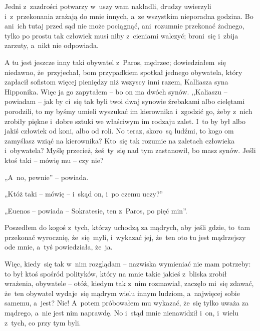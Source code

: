 \documentclass[a4paper,11pt]{article}
\begin{document}

Jedni z~zazdrości potwarzy w~uszy wam nakładli, drudzy uwierzyli
i~z~przekonania zrażają do mnie innych, a~ze wszystkim nieporadna
godzina. Bo ani~ich tutaj przed sąd nie może pociągnąć, ani~rozumnie
przekonać żadnego, tylko po prostu tak człowiek musi niby z~cieniami
walczyć; broni~się i~zbija zarzuty, a~nikt nie odpowiada.


\vspace{\spaceThree}



A tu jest jeszcze inny taki obywatel z~Paros, mędrzec;
dowiedziałem~się niedawno, że~przyjechał, bom przypadkiem spotkał
jednego obywatela, który zapłacił sofistom więcej pieniędzy niż
wszyscy inni razem, Kalliasza syna Hipponika. Więc ja go zapytałem --
bo on ma dwóch synów. ,,Kaliaszu -- powiadam -- jak by ci~się tak byli
twoi dwaj synowie źrebakami albo cielętami porodzili, to my byśmy
umieli wyszukać im kierownika i~zgodzić go, żeby z~nich zrobiły piękne
i~dobre sztuki we właściwym im rodzaju zalet. I~to by był albo jakiś
człowiek od koni, albo od roli. No teraz, skoro~są ludźmi, to kogo om
zamyślasz wziąć na kierownika? Kto~się tak rozumie na zaletach
człowieka i~obywatela? Myślę przecież, żeś~ty~się nad tym zastanowił,
bo masz synów. Jeśli ktoś taki -- mówię mu -- czy nie?

„A~no, pewnie” -- powiada.

„Któż taki -- mówię -- i~skąd on, i~po czemu uczy?”

„Euenos -- powiada -- Sokratesie, ten z~Paros, po pięć min”.


\vspace{\spaceThree}



Poszedłem do kogoś z~tych, którzy uchodzą za mądrych, aby jeśli gdzie,
to~tam przekonać wyrocznię, że~się~myli, i~wykazać jej, że~ten oto tu
jest mądrzejszy ode mnie, a~tyś powiedziała, że~ja.

Więc, kiedy~się tak w~nim rozglądam -- nazwiska wymieniać nie mam
potrzeby: to był ktoś spośród polityków, który na mnie takie jakieś
z~bliska zrobił wrażenia, obywatele -- otóż, kiedym tak z~nim
rozmawiał, zaczęło mi~się zdawać, że~ten obywatel wydaje~się mądrym
wielu innym ludziom, a~najwięcej sobie samemu, a~jest? Nie! A~potem
próbowałem mu wykazać, że~się tylko uważa za mądrego, a~nie jest nim
naprawdę. No i~stąd mnie nienawidził i~on, i~wielu z~tych, co przy tym
byli.
\end{document}
